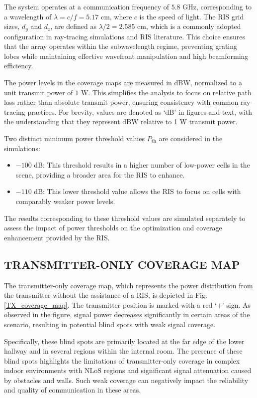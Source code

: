 \documentclass{IEEEoj}
\begin{document}
The system operates at a communication frequency of $5.8$ GHz, corresponding to a wavelength of $\lambda = c/f = 5.17$ cm, where $c$ is the speed of light. The RIS grid sizes, $d_y$ and $d_z$, are defined as $\lambda / 2 = 2.585$ cm, which is a commonly adopted configuration in ray-tracing simulations and RIS literature. This choice ensures that the array operates within the subwavelength regime, preventing grating lobes while maintaining effective wavefront manipulation and high beamforming efficiency.

The power levels in the coverage maps are measured in dBW, normalized to a unit transmit power of $1$ W. This simplifies the analysis to focus on relative path loss rather than absolute transmit power, ensuring consistency with common ray-tracing practices. For brevity, values are denoted as `dB' in figures and text, with the understanding that they represent dBW relative to 1 W transmit power.

Two distinct minimum power threshold values $P_{\text{th}}$ are considered in the simulations:  
\begin{itemize}
	\item $-100$ dB: This threshold results in a higher number of low-power cells in the scene, providing a broader area for the RIS to enhance.
	\item $-110$ dB: This lower threshold value allows the RIS to focus on cells with comparably weaker power levels.
\end{itemize}

The results corresponding to these threshold values are simulated separately to assess the impact of power thresholds on the optimization and coverage enhancement provided by the RIS.

\subsection{TRANSMITTER-ONLY COVERAGE MAP}
The transmitter-only coverage map, which represents the power distribution from the transmitter without the assistance of a RIS, is depicted in Fig. \ref{TX_coverage_map}. The transmitter position is marked with a red `+' sign. As observed in the figure, signal power decreases significantly in certain areas of the scenario, resulting in potential blind spots with weak signal coverage.

Specifically, these blind spots are primarily located at the far edge of the lower hallway and in several regions within the internal room. The presence of these blind spots highlights the limitations of transmitter-only coverage in complex indoor environments with NLoS regions and significant signal attenuation caused by obstacles and walls. Such weak coverage can negatively impact the reliability and quality of communication in these areas.
\end{document}
